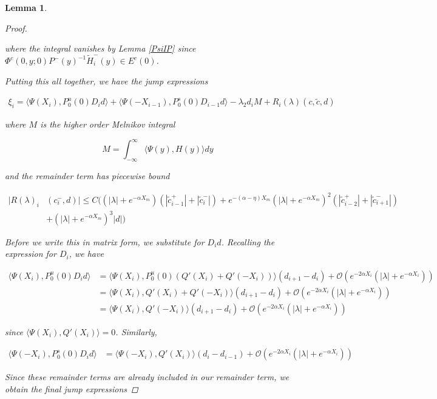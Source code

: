 \documentclass[12pt]{article}
\newtheorem{lemma}{Lemma}
\begin{document}
\begin{lemma}
\begin{proof}
\begin{enumerate}
where the integral vanishes by Lemma \ref{PsiIP} since $\Phi^c(0, y; 0) P^-(y)^{-1} \tilde{H}_i^-(y) \in E^c(0)$.

\end{enumerate}

Putting this all together, we have the jump expressions

\begin{align*}
\xi_i = \langle \Psi(X_i), P_0^u(0) D_i d \rangle
+ \langle \Psi(-X_{i-1}), P_0^s(0) D_{i-1} d \rangle 
- \lambda_2 d_i M + R_i(\lambda)(c, \tilde{c}, d)
\end{align*}

where $M$ is the higher order Melnikov integral

\[
M = \int_{-\infty}^\infty \langle \Psi(y), H(y) \rangle dy 
\]

and the remainder term has piecewise bound

\begin{align*}
|R(\lambda)_i&(c_i^-, d)| \leq C \Big( (|\lambda| + e^{-\alpha X_m})(|\tilde{c}_{i-1}^+| + |\tilde{c}_{i}^-|) + e^{-(\alpha - \eta) X_m}(|\lambda| + e^{-\alpha X_m})^2(|\tilde{c}_{i-2}^+| + |\tilde{c}_{i+1}^-|) \\
&+ (|\lambda| + e^{-\alpha X_m})^3 |d| \Big)
\end{align*}

Before we write this in matrix form, we substitute for $D_i d$. Recalling the expression for $D_i$, we have

\begin{align*}
\langle \Psi(X_i), P_0^u(0) D_i d \rangle
&= \langle \Psi(X_i), P_0^u(0) (Q'(X_i) + Q'(-X_i)) \rangle (d_{i+1} - d_i)
+\mathcal{O}(e^{-2 \alpha X_i}(|\lambda| + e^{-\alpha X_i})) \\
&= \langle \Psi(X_i), Q'(X_i) + Q'(-X_i) \rangle (d_{i+1} - d_i)
+\mathcal{O}(e^{-2 \alpha X_i}(|\lambda| + e^{-\alpha X_i})) \\
&= \langle \Psi(X_i), Q'(-X_i) \rangle (d_{i+1} - d_i)
+\mathcal{O}(e^{-2 \alpha X_i}(|\lambda| + e^{-\alpha X_i})) 
\end{align*}

since $\langle \Psi(X_i), Q'(X_i) \rangle = 0$. Similarly, 

\begin{align*}
\langle \Psi(-X_i), P_0^s(0) D_i d \rangle
&= \langle \Psi(-X_i), Q'(X_i) \rangle (d_i - d_{i-1})
+\mathcal{O}(e^{-2 \alpha X_i}(|\lambda| + e^{-\alpha X_i})) 
\end{align*}

Since these remainder terms are already included in our remainder term, we obtain the final jump expressions


\end{proof}
\end{lemma}
\end{document}
